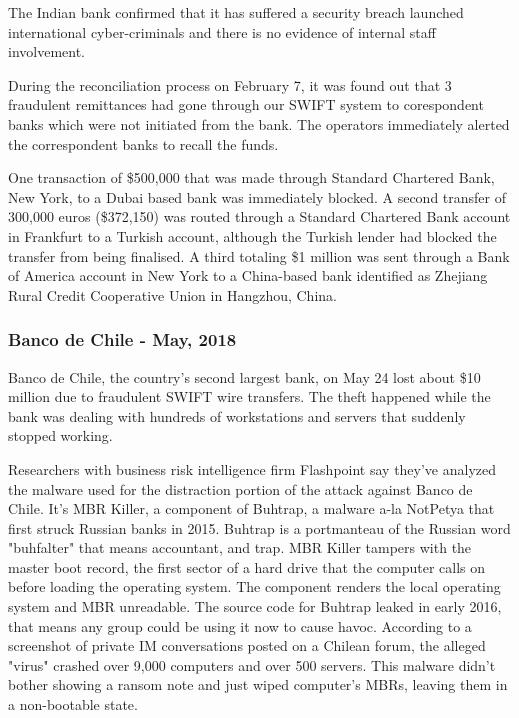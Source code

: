 \documentclass[12pt]{article}
\begin{document}
        The Indian bank confirmed that it has suffered a security breach launched international cyber-criminals and there is no evidence of internal staff involvement. 
        
        During the reconciliation process on February 7, it was found out that 3 fraudulent remittances had gone through our SWIFT system to corespondent banks which were not initiated from the bank. The operators immediately alerted the correspondent banks to recall the funds.

        One transaction of \$500,000 that was made through Standard Chartered Bank, New York, to a Dubai based bank was immediately blocked. A second transfer of 300,000 euros (\$372,150) was routed through a Standard Chartered Bank account in Frankfurt to a Turkish account, although the Turkish lender had blocked the transfer from being finalised. A third totaling \$1 million was sent through a Bank of America account in New York to a China-based bank identified as Zhejiang Rural Credit Cooperative Union in Hangzhou, China.\cite{CityUnionBank2018}\cite{IndiaCityUnion2018}

        
    \subsubsection{Banco de Chile - May, 2018}
        
        Banco de Chile, the country's second largest bank, on May 24 lost about \$10 million due to fraudulent SWIFT wire transfers. The theft happened while the bank was dealing with hundreds of workstations and servers that suddenly stopped working.
        
        Researchers with business risk intelligence firm Flashpoint say they've analyzed the malware used for the distraction portion of the attack against Banco de Chile. It's MBR Killer, a component of Buhtrap, a malware a-la NotPetya that first struck Russian banks in 2015. Buhtrap is a portmanteau of the Russian word "buhfalter" that means accountant, and trap. MBR Killer tampers with the master boot record, the first sector of a hard drive that the computer calls on before loading the operating system. The component renders the local operating system and MBR unreadable. The source code for Buhtrap leaked in early 2016, that means any group could be using it now to cause havoc. According to a screenshot of private IM conversations posted on a Chilean forum, the alleged "virus" crashed over 9,000 computers and over 500 servers. This malware didn't bother showing a ransom note and just wiped computer's MBRs, leaving them in a non-bootable state.
        
\end{document}
